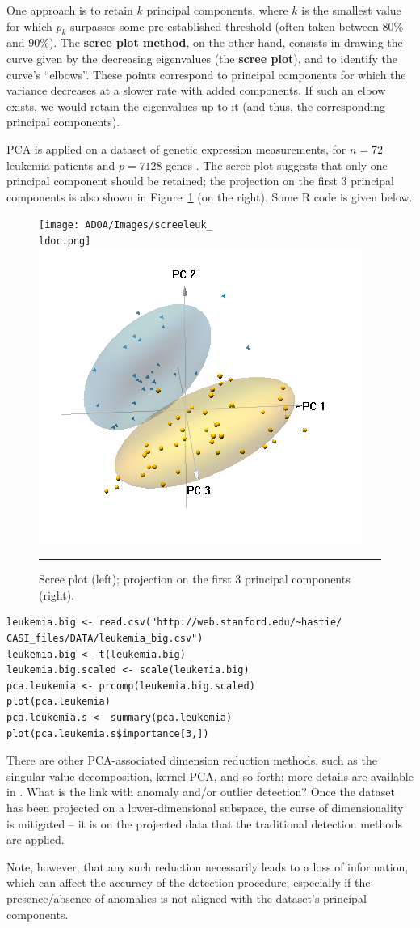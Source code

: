 One approach is to retain $k$ principal components, where $k$ is the smallest value for which  $p_k$ surpasses some pre-established threshold  (often taken between $80\%$ and $90\%$). \newl
The \textbf{scree plot method}, on the other hand, consists in drawing the curve given by the decreasing eigenvalues (the \textbf{scree plot}), and to identify the curve's ``elbows''. These points correspond to principal components for which the variance decreases at a slower rate with added components. If such an elbow exists, we would retain the eigenvalues up to it (and thus,  the corresponding principal components). 
\begin{Example}
PCA is applied on a dataset of genetic expression measurements, for $n=72$ leukemia patients and $p=7128$ genes \cite{Hleukemia}. The scree plot suggests that only one principal component should be retained; the projection on the first 3 principal components is also shown in Figure~\ref{fig0} (on the right). Some R code is given below.
\begin{figure}[t]
    \centering
     \texttt{[image: ADOA/Images/screeleuk\_\\ldoc.png]}
    \includegraphics[width=.4\textwidth]{ADOA/Images/3dpcleuk.PNG}
    \caption{Scree plot (left); projection on the first 3 principal components (right).}\hrule
    \label{fig0}
\end{figure}
\begin{lstlisting}
leukemia.big <- read.csv("http://web.stanford.edu/~hastie/ CASI_files/DATA/leukemia_big.csv")
leukemia.big <- t(leukemia.big)
leukemia.big.scaled <- scale(leukemia.big)
pca.leukemia <- prcomp(leukemia.big.scaled)
plot(pca.leukemia)
pca.leukemia.s <- summary(pca.leukemia) 
plot(pca.leukemia.s$importance[3,])
\end{lstlisting}
\end{Example}
\noindent There are other PCA-associated dimension reduction methods, such as the singular value decomposition, kernel PCA, and so forth; more details are available in \cite{BLMMP}.
\newl What is the link with anomaly and/or outlier detection? Once the dataset has been projected on a lower-dimensional subspace, the curse of dimensionality is mitigated -- it is on the projected data that the traditional detection methods are applied. \par Note, however, that any such reduction necessarily leads to a loss of information, which can affect the accuracy of the detection procedure, especially if the presence/absence of anomalies is not aligned with the dataset's principal components. 

